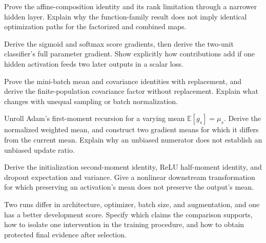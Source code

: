 \begin{challengeexercises}
\item {}Prove the affine-composition identity and its rank limitation through a narrower hidden layer. Explain why the function-family result does not imply identical optimization paths for the factorized and combined maps.
\item {}Derive the sigmoid and softmax score gradients, then derive the two-unit classifier's full parameter gradient. Show explicitly how contributions add if one hidden activation feeds two later outputs in a scalar loss.
\item \begin{minipage}[t]{\linewidth}Prove the mini-batch mean and covariance identities with replacement, and derive the finite-population covariance factor without replacement. Explain what changes with unequal sampling or batch normalization.\end{minipage}
\item {}Unroll Adam's first-moment recursion for a varying mean $\mathbb E[g_s]=\mu_s$. Derive the normalized weighted mean, and construct two gradient means for which it differs from the current mean. Explain why an unbiased numerator does not establish an unbiased update ratio.
\item \begin{minipage}[t]{\linewidth}Derive the initialization second-moment identity, ReLU half-moment identity, and dropout expectation and variance. Give a nonlinear downstream transformation for which preserving an activation's mean does not preserve the output's mean.\end{minipage}
\item {}Two runs differ in architecture, optimizer, batch size, and augmentation, and one has a better development score. Specify which claims the comparison supports, how to isolate one intervention in the training procedure, and how to obtain protected final evidence after selection.
\end{challengeexercises}

\clearpage
\begingroup\pagestyle{empty}\cleardoublepage\endgroup
\endgroup

